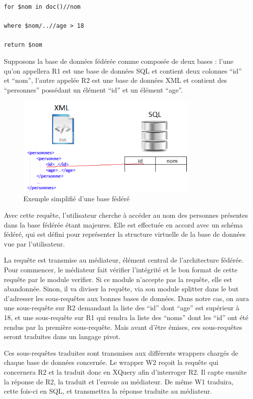 \begin{verbatim}
for $nom in doc()//nom

where $nom/..//age > 18

return $nom
\end{verbatim}

Supposons la base de données fédérée comme composée de deux bases : l’une qu’on appellera R1 est une base de données SQL et contient deux colonnes “id” et “nom”, l’autre appelée R2 est une base de données XML et contient des “personnes” possédant un élément “id” et un élément “age”. 

\begin{figure}[h!]
    \centering
    \includegraphics[width=0.8\textwidth]{ressources/graphiques/xmlAndSql_simple_example.png}
    \caption{Exemple simplifié d'une base fédéré}
\end{figure}


Avec cette requête, l’utilisateur cherche à accéder au nom des personnes présentes dans la base fédérée étant majeures. Elle est effectuée en accord avec un schéma fédéré, qui est défini pour représenter la structure virtuelle de la base de données vue par l’utilisateur.

La requête est transmise au médiateur, élément central de l’architecture fédérée. Pour commencer, le médiateur fait vérifier l’intégrité et le bon format de cette requête par le module verifier. Si ce module n’accepte pas la requête, elle est abandonnée. Sinon, il va diviser la requête, via son module splitter dans le but d’adresser les sous-requêtes aux bonnes bases de données. Dans notre cas, on aura une sous-requête sur R2 demandant la liste des “id” dont “age” est supérieur à 18, et une sous-requête sur R1 qui rendra la liste des “noms” dont les “id” ont été rendus par la première sous-requête. Mais avant d’être émises, ces sous-requêtes seront traduites dans un langage pivot.

Ces sous-requêtes traduites sont transmises aux différents wrappers chargés de chaque base de données concernée. Le wrapper W2 reçoit la requête qui concernera R2 et la traduit donc en XQuery afin d’interroger R2. Il capte ensuite la réponse de R2, la traduit et l’envoie au médiateur. De même W1 traduira, cette fois-ci en SQL, et transmettra la réponse traduite au médiateur.


